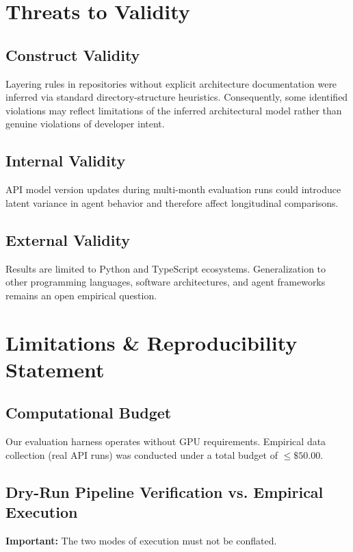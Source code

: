 \documentclass[11pt]{article}
\begin{document}
\section{Threats to Validity}
\label{sec:threats}

\subsection{Construct Validity}

Layering rules in repositories without explicit architecture
documentation were inferred via standard directory-structure
heuristics. Consequently, some identified violations may reflect
limitations of the inferred architectural model rather than genuine
violations of developer intent.

\subsection{Internal Validity}

API model version updates during multi-month evaluation runs could
introduce latent variance in agent behavior and therefore affect
longitudinal comparisons.

\subsection{External Validity}

Results are limited to Python and TypeScript ecosystems. Generalization
to other programming languages, software architectures, and agent
frameworks remains an open empirical question.


\section{Limitations \& Reproducibility Statement}
\label{sec:reproducibility}

\subsection{Computational Budget}
Our evaluation harness operates without GPU requirements.
Empirical data collection (real API runs) was conducted under a total
budget of $\leq\$50.00$.

\subsection{Dry-Run Pipeline Verification vs. Empirical Execution}
\textbf{Important:} The two modes of execution must not be conflated.
\end{document}
